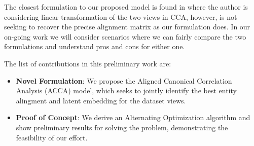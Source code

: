 
The closest formulation to our proposed model is found in \cite{sahbi2018learning} where the author is considering linear transformation of the two views in CCA, however, is not seeking to recover the precise alignment matrix as our formulation does. In our on-going work we will consider scenarios where we can fairly compare the two formulations and understand pros and cons for either one.

The list of contributions in this preliminary work are:
\begin{itemize}
    \item {\bf Novel Formulation}: We propose the Aligned Canonical Correlation Analysis (ACCA) model, which seeks to jointly identify the best entity alingment and latent embedding for the dataset views.
    \item{\bf Proof of Concept}: We derive an Alternating Optimization algorithm and show preliminary results for solving the problem, demonstrating the feasibility of our effort.
\end{itemize}